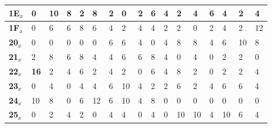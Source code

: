 \begin{longtable}[c]{|l|l|l|l|l|l|l|l|l|l|l|l|l|l|l|l|l|}
\textbf{1E$_x$} & 0              & 10             & 8              & 2              & 8              & 2              & 0              & 2              & 6              & 4              & 2              & 4              & 6              & 4              & 2              & 4              \\ \hline
\textbf{1F$_x$} & 0              & 6              & 6              & 8              & 6              & 4              & 2              & 4              & 4              & 2              & 2              & 0              & 2              & 4              & 2              & 12             \\ \hline
\textbf{20$_x$} & 0              & 0              & 0              & 0              & 0              & 6              & 6              & 4              & 0              & 4              & 8              & 8              & 4              & 6              & 10             & 8              \\ \hline
\textbf{21$_x$} & 2              & 8              & 6              & 8              & 4              & 4              & 6              & 6              & 8              & 4              & 0              & 4              & 0              & 2              & 2              & 0              \\ \hline
\textbf{22$_x$} & \textbf{16}             & 2              & 4              & 6              & 2              & 4              & 2              & 0              & 6              & 4              & 8              & 2              & 0              & 2              & 2              & 4              \\ \hline
\textbf{23$_x$} & 0              & 4              & 0              & 4              & 4              & 6              & 10             & 4              & 2              & 2              & 6              & 2              & 4              & 6              & 6              & 4              \\ \hline
\textbf{24$_x$} & 10             & 8              & 0              & 6              & 12             & 6              & 10             & 4              & 8              & 0              & 0              & 0              & 0              & 0              & 0              & 0              \\ \hline
\textbf{25$_x$} & 0              & 2              & 4              & 2              & 0              & 4              & 4              & 0              & 4              & 0              & 10             & 10             & 4              & 10             & 6              & 4              \\ \hline

\end{longtable}

